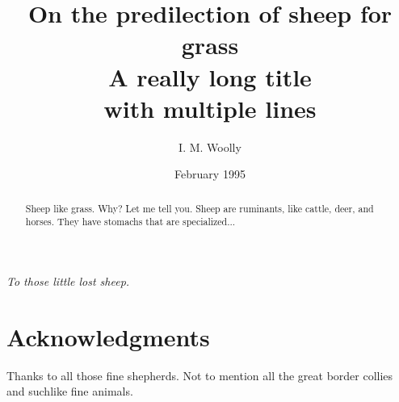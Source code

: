 \documentclass[thesis]{umassthesis}  %
\begin{document}
\title{On the predilection of sheep for grass\protect\\A really long
  title\protect\\with multiple lines}
\author{I. M. Woolly}
\date{February 1995} %





\frontmatter
\maketitle
\copyrightpage     %
\signaturepage

\begin{dedication}              %
  \begin{center}
    \emph{To those little lost sheep.}
  \end{center}
\end{dedication}

\chapter{Acknowledgments}             %
  Thanks to all those fine shepherds. Not to mention all the great
  border collies and suchlike fine animals.

\begin{abstract}                %
  Sheep like grass.  Why?  Let me tell you.  Sheep are ruminants, like
  cattle, deer, and horses.  They have stomachs that are specialized...
\end{abstract}
\end{document}
